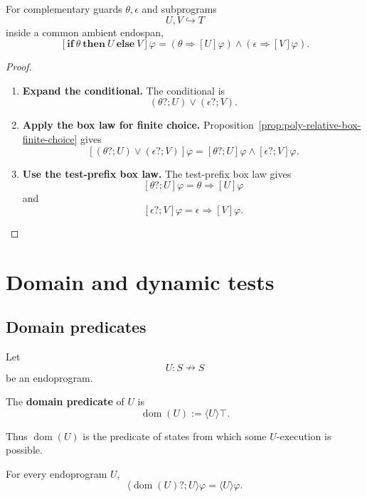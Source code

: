 \begin{proposition}
\label{prop:poly-relative-conditional-box-law}
For complementary guards \(\theta,\epsilon\) and subprograms
\[
U,V\hookrightarrow T
\]
inside a common ambient endospan,
\[
\left[
\mathbf{if}\ \theta\ \mathbf{then}\ U\ \mathbf{else}\ V
\right]\varphi
=
(\theta\Rightarrow[U]\varphi)
\wedge
(\epsilon\Rightarrow[V]\varphi).
\]
\end{proposition}

\begin{proof}
\leavevmode
\begin{enumerate}
\item \textbf{Expand the conditional.}
The conditional is
\[
(\theta?;U)\vee(\epsilon?;V).
\]

\item \textbf{Apply the box law for finite choice.}
Proposition~\ref{prop:poly-relative-box-finite-choice} gives
\[
[(\theta?;U)\vee(\epsilon?;V)]\varphi
=
[\theta?;U]\varphi\wedge[\epsilon?;V]\varphi.
\]

\item \textbf{Use the test-prefix box law.}
The test-prefix box law gives
\[
[\theta?;U]\varphi=\theta\Rightarrow[U]\varphi
\]
and
\[
[\epsilon?;V]\varphi=\epsilon\Rightarrow[V]\varphi.
\]
\end{enumerate}
\end{proof}


\section{Domain and dynamic tests}
\label{sec:poly-relative-domain-tests}

\subsection{Domain predicates}
\label{subsec:poly-relative-domain-predicate}

Let
\[
U:S\nrightarrow S
\]
be an endoprogram.

\begin{definition}
\label{def:poly-relative-domain}
The \textbf{domain predicate} of \(U\) is
\[
\operatorname{dom}(U):=\langle U\rangle\top.
\]
\end{definition}

Thus \(\operatorname{dom}(U)\) is the predicate of states from which some
\(U\)-execution is possible.

\begin{proposition}
\label{prop:poly-relative-domain-prefix}
For every endoprogram \(U\),
\[
\langle \operatorname{dom}(U)?;U\rangle\varphi
=
\langle U\rangle\varphi.
\]
\end{proposition}

